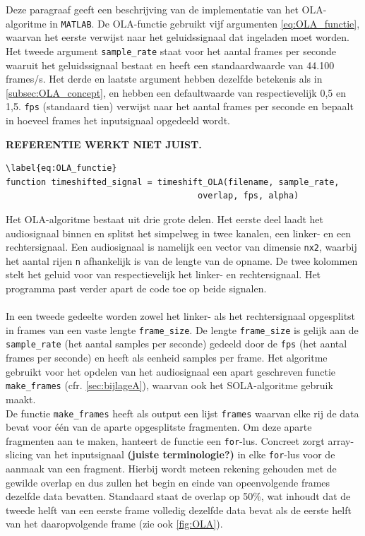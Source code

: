 \documentclass[12pt]{report}
\begin{document}
\noindent Deze paragraaf geeft een beschrijving van de implementatie van het OLA-algoritme in \verb+MATLAB+. De OLA-functie gebruikt vijf argumenten \cref{eq:OLA_functie}, waarvan het eerste verwijst naar het geluidssignaal dat ingeladen moet worden. Het tweede argument \verb+sample_rate+ staat voor het aantal frames per seconde waaruit het geluidssignaal bestaat en heeft een standaardwaarde van 44.100 frames/s. Het derde en laatste argument hebben dezelfde betekenis als in \cref{subsec:OLA_concept}, en hebben een defaultwaarde van respectievelijk 0,5 en 1,5. \verb+fps+ (standaard tien) verwijst naar het aantal frames per seconde en bepaalt in hoeveel frames het inputsignaal opgedeeld wordt.

\textbf{REFERENTIE WERKT NIET JUIST.}
\begin{verbatim}
\label{eq:OLA_functie}
function timeshifted_signal = timeshift_OLA(filename, sample_rate,
		                              overlap, fps, alpha)		                           
\end{verbatim}
Het OLA-algoritme bestaat uit drie grote delen. Het eerste deel laadt het audiosignaal binnen en splitst het simpelweg in twee kanalen, een linker- en een rechtersignaal. Een audiosignaal is namelijk een vector van dimensie \verb+nx2+, waarbij het aantal rijen \verb+n+ afhankelijk is van de lengte van de opname. De twee kolommen stelt het geluid voor van respectievelijk het linker- en rechtersignaal. Het programma  past verder apart de code toe op beide signalen.\\
\\
In een tweede gedeelte worden zowel het linker- als het rechtersignaal opgesplitst in frames van een vaste lengte \verb+frame_size+. De lengte \verb+frame_size+ is gelijk aan de \verb+sample_rate+ (het aantal samples per seconde) gedeeld door de \verb+fps+ (het aantal frames per seconde) en heeft als eenheid samples per frame. Het algoritme gebruikt voor het opdelen van het audiosignaal een apart geschreven functie \verb+make_frames+ (cfr. \cref{sec:bijlageA}), waarvan ook het SOLA-algoritme gebruik maakt. \\
De functie \verb+make_frames+ heeft als output een lijst \verb+frames+ waarvan elke rij de data bevat voor \'e\'en van de aparte opgesplitste fragmenten. Om deze aparte fragmenten aan te maken, hanteert de functie een \verb+for+-lus. Concreet zorgt array-slicing van het inputsignaal \textbf{(juiste terminologie?)} in elke \verb+for+-lus voor de aanmaak van een fragment.  Hierbij wordt meteen rekening gehouden met de gewilde overlap en dus zullen het begin en einde van opeenvolgende frames dezelfde data bevatten. Standaard staat de overlap op 50\%, wat inhoudt dat de tweede helft van een eerste frame volledig dezelfde data bevat als de eerste helft van het daaropvolgende frame (zie ook \cref{fig:OLA}).\\
\end{document}
